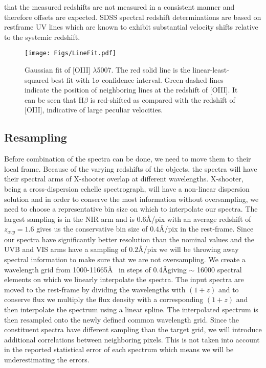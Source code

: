 \documentclass{aa}    %
\newcommand{\figlabel}[1]{\label{fig:#1}}
\newcommand{\sectlabel}[1]{\label{sect:#1}}
\begin{document}
that the measured redshifts are not measured in a consistent manner and therefore offsets are expected. SDSS spectral redshift determinations are based on restframe UV lines which are known to exhibit substantial velocity shifts relative to the systemic redshift.

\begin{figure}[hbtp]
  \centering
  \texttt{[image: Figs/LineFit.pdf]}
  \caption[]{Gaussian fit of [OIII] $\lambda$5007. The red solid line is the linear-least-squared best fit with 1$\sigma$ confidence interval. Green dashed lines indicate the position of neighboring lines at the redshift of [OIII]. It can be seen that H$\beta$ is red-shifted as compared with the redshift of [OIII], indicative of large peculiar velocities.}
  \figlabel{linefit}
\end{figure}





\subsection{Resampling} \sectlabel{rebin}


Before combination of the spectra can be done, we need to move them to their local frame. Because of the varying redshifts of the objects, the spectra will have their spectral arms of X-shooter overlap at different wavelengths. X-shooter, being a cross-dispersion echelle spectrograph, will have a non-linear dispersion solution and in order to conserve the most information without oversampling, we need to choose a representative bin size on which to interpolate our spectra. The largest sampling is in the NIR arm and is $0.6$\AA/pix with an average redshift of $z_{avg} = 1.6$ gives us the conservative bin size of $0.4$\AA/pix in the rest-frame. Since our spectra have significantly better resolution than the nominal values and the UVB and VIS arms have a sampling of $0.2$\AA/pix we will be throwing away spectral information to make sure that we are not oversampling. We create a wavelength grid from 1000-11665\AA~ in steps of 0.4\AA giving $\sim$ 16000 spectral elements on which we linearly interpolate the spectra. The input spectra are moved to the rest-frame by dividing the wavelengths with $(1 + z)$ and to conserve flux we multiply the flux density with a corresponding $(1 + z)$ and then interpolate the spectrum using a linear spline. The interpolated spectrum is then resampled onto the newly defined common wavelength grid. Since the constituent spectra have different sampling than the target grid, we will introduce additional correlations between neighboring pixels. This is not taken into account in the reported statistical error of each spectrum which means we will be underestimating the errors. 
\end{document}
